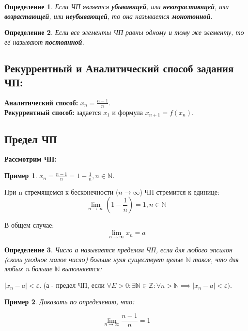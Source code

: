 \documentclass[12pt, a4paper]{article}
\newtheorem{definition}{Определение}[subsection]
\newtheorem{example}{Пример}[subsection]
\theoremstyle{remark}
\newcommand{\N}{\mathbb{N}}
\newcommand{\Z}{\mathbb{Z}}
\newcommand{\Y}{\mathbb{\forall}}
\newcommand{\F}{\mathbb{\exists}}
\newcommand{\E}{\mathbb{\varepsilon}}
\begin{document}
	\begin{definition}
		Если ЧП является \textbf{убывающей}, или \textbf{невозрастающей}, или \textbf{возрастающей}, или \textbf{неубывающей}, то она называется \textbf{монотонной}.
	\end{definition}
	
	\begin{definition}
		Если все элементы ЧП равны одному и тому же элементу, то её называют \textbf{постоянной}.
	\end{definition}
	
	\subsection{Рекуррентный и Аналитический способ задания ЧП:}
	
	\textbf{Аналитический способ:} \(x_n = \frac{n-1}{n}\). \\
	\textbf{Рекуррентный способ:} задается \(x_1\) и формула \(x_{n+1} = f(x_n)\).
	
	\subsection{Предел ЧП}
	
	\textbf{Рассмотрим ЧП:}
	
	\begin{example}
		$x_n = \frac{n-1}{n} = 1 - \frac{1}{n}, n \in \N$.
	\end{example}
	
	При n стремящемся к бесконечности ($n \to \infty$) ЧП стремится к единице:
	\[
	\lim_{n \to \infty} \left(1 - \frac{1}{n}\right) = 1, n \in \N
	\]
	
	В общем случае: 
	\[
	\lim_{n \to \infty} x_n = a
	\]
	
	\begin{definition}
		Число а называется пределом ЧП, если для любого эпсилон (сколь угодное малое число) больше нуля существует целые $\N$ такое, что для любых n больше $\N$ выполняется: 
	\end{definition}
	
	$|x_n - a| < \E$. (а - предел ЧП, если $\Y E > 0:\F\N \in \Z: \Y n > \N \implies |x_n - a| < \E)$.
	
	\newpage
	\begin{example}
		Доказать по определению, что:
	\end{example}
	
	\[
	\lim_{n \to \infty} \frac{n-1}{n} = 1
	\]
	
\end{document}
